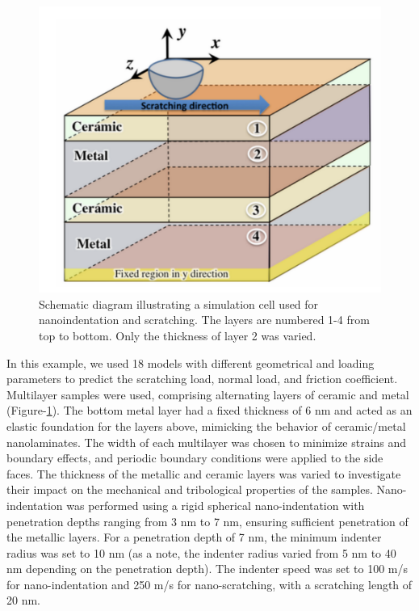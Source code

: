 \documentclass{article}
\begin{document}
\begin{figure}[!h]
    \begin{center}
        \includegraphics[scale=0.30]{figures/material_design_domian.png}
    \end{center}
    \caption{Schematic diagram illustrating a simulation cell used for nanoindentation and scratching. The layers are numbered 1-4 from top to bottom. Only the thickness of layer 2 was varied.}
    \label{fig:material_design_domian}
\end{figure}

In this example, we used 18 models with different geometrical and loading parameters to predict
the scratching load, normal load, and friction coefficient. Multilayer samples were used, comprising
alternating layers of ceramic and metal (Figure-\ref{fig:material_design_domian}). The bottom metal layer had a fixed thickness of 6 nm
and acted as an elastic foundation for the layers above, mimicking the behavior of ceramic/metal
nanolaminates. The width of each multilayer was chosen to minimize strains and boundary effects, and
periodic boundary conditions were applied to the side faces. The thickness of the metallic and ceramic
layers was varied to investigate their impact on the mechanical and tribological properties of the samples.
Nano-indentation was performed using a rigid spherical nano-indentation with penetration depths ranging
from 3 nm to 7 nm, ensuring sufficient penetration of the metallic layers. For a penetration depth of 7 nm,
the minimum indenter radius was set to 10 nm (as a note, the indenter radius varied from 5 nm to 40 nm
depending on the penetration depth). The indenter speed was set to 100 m/s for nano-indentation and 250
m/s for nano-scratching, with a scratching length of 20 nm.
\end{document}

